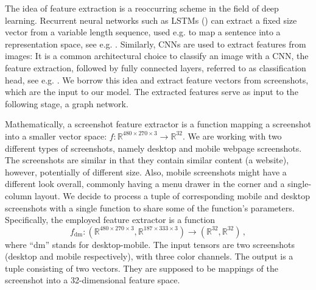 The idea of feature extraction is a reoccurring scheme in the field of deep learning. Recurrent neural networks such as LSTMs (\cite{hochreiter1997lstm}) can extract a fixed size vector from a variable length sequence, used e.g. to map a sentence into a representation space, see e.g. \cite{salesforceabstractivesummarization}. Similarly, CNNs are used to extract features from images: It is a common architectural choice to classify an image with a CNN, the feature extraction, followed by fully connected layers, referred to as classification head, see e.g. \cite{krizhevsky:imagenet,szegedy2017inception,Girshick15:fastrcnn}. We borrow this idea and extract feature vectors from screenshots, which are the input to our model. The extracted features serve as input to the following stage, a graph network.

Mathematically, a screenshot feature extractor is a function mapping a screenshot into a smaller vector space: $f:\mathbb{R}^{480\times270\times3}\rightarrow\mathbb{R}^{32}$. We are working with two different types of screenshots, namely desktop and mobile webpage screenshots. The screenshots are similar in that they contain similar content (a website), however, potentially of different size. Also, mobile screenshots might have a different look overall, commonly having a menu drawer in the corner and a single-column layout. We decide to process a tuple of corresponding mobile and desktop screenshots with a single function to share some of the function's parameters. Specifically, the employed feature extractor is a function \begin{equation}
f_\text{dm}:\left(\mathbb{R}^{480\times270\times3},\mathbb{R}^{187\times333\times3}\right)\rightarrow\left(\mathbb{R}^{32},\mathbb{R}^{32}\right)\,,
\end{equation} where \enquote{dm} stands for desktop-mobile. The input tensors are two screenshots (desktop and mobile respectively), with three color channels. The output is a tuple consisting of two vectors. They are supposed to be mappings of the screenshot into a 32-dimensional feature space.

